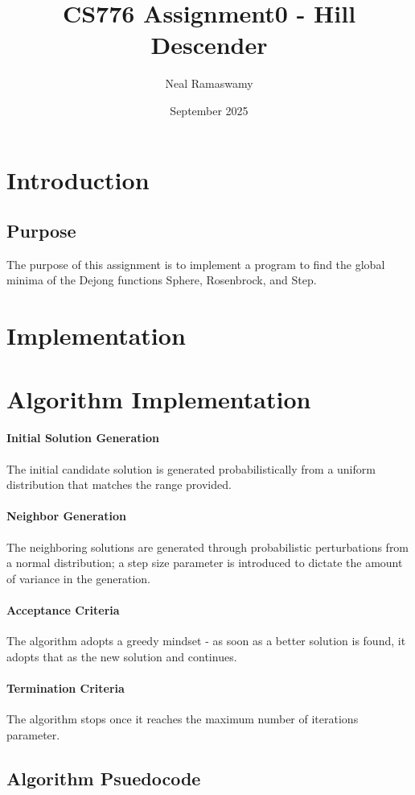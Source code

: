 \documentclass{article}
\title{CS776 Assignment0 - Hill Descender}
\author{Neal Ramaswamy}
\date{September 2025}
\begin{document}
\maketitle

\section{Introduction}

\subsection{Purpose}
The purpose of this assignment is to implement a program to find the global minima of the Dejong functions Sphere, Rosenbrock, and Step.

\section{Implementation}
\section{Algorithm Implementation}
\paragraph{Initial Solution Generation} The initial candidate solution is generated probabilistically from a uniform distribution that matches the range provided. 
\paragraph{Neighbor Generation} The neighboring solutions are generated through probabilistic perturbations from a normal distribution; a step size parameter is introduced to dictate the amount of variance in the generation.
\paragraph{Acceptance Criteria} The algorithm adopts a greedy mindset - as soon as a better solution is found, it adopts that as the new solution and continues.
\paragraph{Termination Criteria} The algorithm stops once it reaches the maximum number of iterations parameter. 

\subsection{Algorithm Psuedocode}
\end{document}
